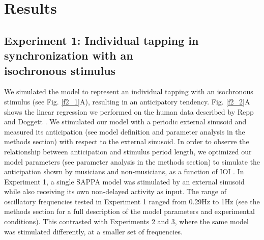 \documentclass{report}
\begin{document}
\section{Results}

\subsection{Experiment 1: Individual tapping in synchronization with an \\ isochronous stimulus}

We simulated the model to represent an individual tapping with an isochronous stimulus (see Fig.{} \ref{f2_1}A), resulting in an anticipatory tendency. Fig.{} \ref{f2_2}A shows the linear regression we performed on the human data described by Repp and Doggett \cite{repp2007tapping}. We stimulated our model with a periodic external sinusoid and measured its anticipation (see model definition and parameter analysis in the methods section) with respect to the external sinusoid. In order to observe the relationship between anticipation and stimulus period length, we optimized our model parameters (see parameter analysis in the methods section) to simulate the anticipation shown by musicians and non-musicians, as a function of IOI \cite{repp2007tapping}. In Experiment 1, a single SAPPA model was stimulated by an external sinusoid while also receiving its own non-delayed activity as input. The range of oscillatory frequencies tested in Experiment 1 ranged from 0.29Hz to 1Hz (see the methods section for a full description of the model parameters and experimental conditions). This contrasted with Experiments 2 and 3, where the same model was stimulated differently, at a smaller set of frequencies.
\end{document}
